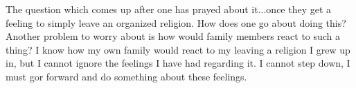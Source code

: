 The question which comes up after one has prayed about it...once they get a feeling
to simply leave an organized religion. How does one go about doing this? Another
problem to worry about is how would family members react to such a thing? I know how
my own family would react to my leaving a religion I grew up in, but I cannot ignore
the feelings I have had regarding it. I cannot step down, I must gor forward and do
something about these feelings.
